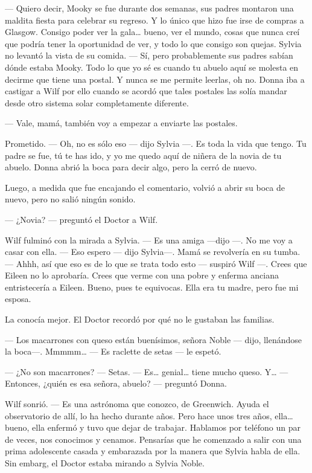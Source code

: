 --- Quiero decir, Mooky se fue durante dos semanas, sus padres montaron
una maldita fiesta para celebrar su regreso. Y lo único que hizo fue
irse de compras a Glasgow. Consigo poder ver la gala\ldots{} bueno, ver
el mundo, cosas que nunca creí que podría tener la oportunidad de ver, y
todo lo que consigo son quejas. Sylvia no levantó la vista de su comida.
--- Sí, pero probablemente sus padres sabían dónde estaba Mooky. Todo lo
que yo sé es cuando tu abuelo aquí se molesta en decirme que tiene una
postal. Y nunca se me permite leerlas, oh no. Donna iba a castigar a
Wilf por ello cuando se acordó que tales postales las solía mandar desde
otro sistema solar completamente diferente.

--- Vale, mamá, también voy a empezar a enviarte las postales.

Prometido. --- Oh, no es sólo eso --- dijo Sylvia ---. Es toda la vida
que tengo. Tu padre se fue, tú te has ido, y yo me quedo aquí de niñera
de la novia de tu abuelo. Donna abrió la boca para decir algo, pero la
cerró de nuevo.

Luego, a medida que fue encajando el comentario, volvió a abrir su boca
de nuevo, pero no salió ningún sonido.

--- ¿Novia? --- preguntó el Doctor a Wilf.

Wilf fulminó con la mirada a Sylvia. --- Es una amiga ---dijo ---. No me
voy a casar con ella. --- Eso espero --- dijo Sylvia---. Mamá se
revolvería en su tumba. --- Ahhh, así que eso es de lo que se trata todo
esto --- suspiró Wilf ---. Crees que Eileen no lo aprobaría. Crees que
verme con una pobre y enferma anciana entristecería a Eileen. Bueno,
pues te equivocas. Ella era tu madre, pero fue mi esposa.

La conocía mejor. El Doctor recordó por qué no le gustaban las familias.

--- Los macarrones con queso están buenísimos, señora Noble --- dijo,
llenándose la boca---. Mmmmm\ldots{} --- Es raclette de setas --- le
espetó.

--- ¿No son macarrones? --- Setas. --- Es\ldots{} genial\ldots{} tiene
mucho queso. Y\ldots{} --- Entonces, ¿quién es esa señora, abuelo? ---
preguntó Donna.

Wilf sonrió. --- Es una astrónoma que conozco, de Greenwich. Ayuda el
observatorio de allí, lo ha hecho durante años. Pero hace unos tres
años, ella\ldots{} bueno, ella enfermó y tuvo que dejar de trabajar.
Hablamos por teléfono un par de veces, nos conocimos y cenamos.
Pensarías que he comenzado a salir con una prima adolescente casada y
embarazada por la manera que Sylvia habla de ella. Sin embarg, el Doctor
estaba mirando a Sylvia Noble.

